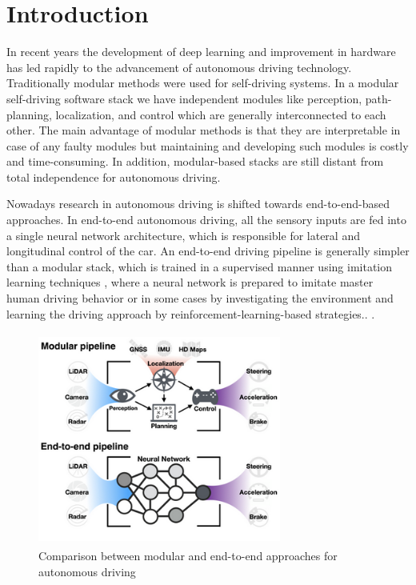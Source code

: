 

    \chapter{Introduction}
    In recent years the development of deep learning and improvement in hardware has led rapidly to the advancement of autonomous driving technology. Traditionally modular methods were used for self-driving systems. In a modular self-driving software stack we have independent modules like perception, path-planning, localization, and control which are generally interconnected to each other. The main advantage of modular methods is that they are interpretable in case of any faulty modules but maintaining and developing such modules is costly and time-consuming. In addition, modular-based stacks are still distant from total independence for autonomous driving.
    \par Nowadays research in autonomous driving is shifted towards end-to-end-based approaches. In end-to-end autonomous driving, all the sensory inputs are fed into a single neural network architecture, which is responsible for lateral and longitudinal control of the car.  An end-to-end driving pipeline is generally simpler than a modular stack, which is trained in a supervised manner using imitation learning techniques \cite{DBLP:journals/corr/abs-1710-02410}, \cite{pan2019agile} where a neural network is prepared to imitate master human driving behavior or in some cases by investigating the environment and learning the driving approach by reinforcement-learning-based strategies.. \cite{DBLP:journals/corr/abs-1807-00412}.  

     \begin{figure}[h]
    \centering
    \includegraphics[width=8cm, height=7cm]{images/Modularvsend.png}
    \caption{Comparison between modular and end-to-end approaches for autonomous driving \cite{DBLP:journals/corr/abs-2003-06404}}
    \end{figure}
    
